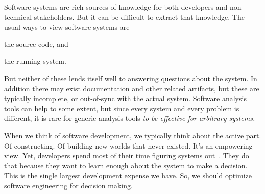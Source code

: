 \documentclass[acmsmall,screen,authorversion,nonacm]{acmart} %
\newcommand\cp[1]{\nbe{Cesare}{#1}{olive}} %
\newcommand\ws[1]{\nbe{Workshop}{#1}{teal}} %
\begin{document}

Software systems are rich sources of knowledge for both developers and non-technical stakeholders.
But it can be difficult to extract that knowledge.
The usual ways to view software systems are
\begin{inparaenum}[(i)]
\item the source code, and
\item the running system.
\end{inparaenum}
But neither of these lends itself well to answering questions about the system.
In addition there may exist documentation and other related artifacts, but these are typically incomplete, or out-of-sync with the actual system.
Software analysis tools can help to some extent, but since every system and every problem is different, it is rare for generic analysis tools \emph{to be effective for arbitrary systems.}

When we think of software development, we typically think about the active part.
Of constructing.
Of building new worlds that never existed.
It's an empowering view.
Yet, developers spend most of their time figuring systems out~\cite{Zelk79b}.
They do that because they want to learn enough about the system to make a decision.
This is the single largest development expense we have.
So, we should optimize software engineering for decision making.
\end{document}
